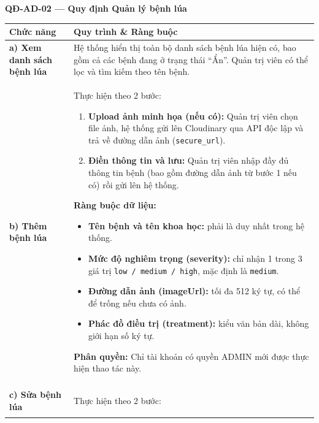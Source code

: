 \documentclass[12pt,a4paper]{article}
\begin{document}
\vspace{0.3cm}
\noindent\textbf{QĐ-AD-02 --- Quy định Quản lý bệnh lúa}

\begin{longtable}{|
        >{\raggedright\arraybackslash}p{2.8cm}|
        >{\raggedright\arraybackslash}p{12cm}|}
    \hline
    \rowcolor{headerblue}
    \textbf{Chức năng}                 & \textbf{Quy trình \& Ràng buộc}                                                                                    \\
    \hline
    \endhead
    \textbf{a) Xem danh sách bệnh lúa} &
    Hệ thống hiển thị toàn bộ danh sách bệnh lúa hiện có, bao gồm cả các bệnh đang ở trạng thái ``Ẩn''. Quản trị viên có thể lọc và tìm kiếm theo tên bệnh. \\
    \hline
    \textbf{b) Thêm bệnh lúa}          &
    Thực hiện theo 2 bước:
    \begin{enumerate}[leftmargin=*,topsep=2pt,itemsep=1pt]
        \item \textbf{Upload ảnh minh họa (nếu có):} Quản trị viên chọn file ảnh, hệ thống gửi lên Cloudinary qua API độc lập và trả về đường dẫn ảnh (\texttt{secure\_url}).
        \item \textbf{Điền thông tin và lưu:} Quản trị viên nhập đầy đủ thông tin bệnh (bao gồm đường dẫn ảnh từ bước 1 nếu có) rồi gửi lên hệ thống.
    \end{enumerate}
    \textbf{Ràng buộc dữ liệu:}
    \begin{itemize}[leftmargin=*,topsep=2pt,itemsep=1pt]
        \item \textbf{Tên bệnh và tên khoa học:} phải là duy nhất trong hệ thống.
        \item \textbf{Mức độ nghiêm trọng (severity):} chỉ nhận 1 trong 3 giá trị \texttt{low / medium / high}, mặc định là \texttt{medium}.
        \item \textbf{Đường dẫn ảnh (imageUrl):} tối đa 512 ký tự, có thể để trống nếu chưa có ảnh.
        \item \textbf{Phác đồ điều trị (treatment):} kiểu văn bản dài, không giới hạn số ký tự.
    \end{itemize}
    \textbf{Phân quyền:} Chỉ tài khoản có quyền ADMIN mới được thực hiện thao tác này.                                                                      \\
    \hline
    \textbf{c) Sửa bệnh lúa}           &
    Thực hiện theo 2 bước:
    \begin{enumerate}[leftmargin=*,topsep=2pt,itemsep=1pt]

\end{enumerate}
\end{longtable}
\end{document}
